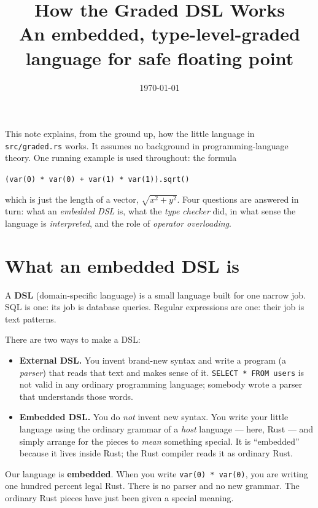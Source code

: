 \documentclass[11pt]{article}
\title{\vspace{-1.5em}How the Graded DSL Works\\[0.3em]
  \large An embedded, type-level-graded language for safe floating point}
\author{}
\date{\today}
\newcommand{\code}[1]{\texttt{#1}}
\begin{document}
\maketitle
\vspace{-2em}

\noindent
This note explains, from the ground up, how the little language in
\code{src/graded.rs} works. It assumes no background in programming-language
theory. One running example is used throughout: the formula

\begin{center}
\code{(var(0) * var(0) + var(1) * var(1)).sqrt()}
\end{center}

\noindent
which is just the length of a vector, $\sqrt{x^{2}+y^{2}}$. Four questions are
answered in turn: what an \emph{embedded DSL} is, what the \emph{type checker}
did, in what sense the language is \emph{interpreted}, and the role of
\emph{operator overloading}.

\section{What an embedded DSL is}

A \textbf{DSL} (domain-specific language) is a small language built for one
narrow job. SQL is one: its job is database queries. Regular expressions are
one: their job is text patterns.

There are two ways to make a DSL:

\begin{itemize}[leftmargin=1.4em]
  \item \textbf{External DSL.} You invent brand-new syntax and write a program
  (a \emph{parser}) that reads that text and makes sense of it. \code{SELECT *
  FROM users} is not valid in any ordinary programming language; somebody wrote
  a parser that understands those words.
  \item \textbf{Embedded DSL.} You do \emph{not} invent new syntax. You write
  your little language using the ordinary grammar of a \emph{host} language ---
  here, Rust --- and simply arrange for the pieces to \emph{mean} something
  special. It is ``embedded'' because it lives inside Rust; the Rust compiler
  reads it as ordinary Rust.
\end{itemize}

Our language is \textbf{embedded}. When you write \code{var(0) * var(0)}, you
are writing one hundred percent legal Rust. There is no parser and no new
grammar. The ordinary Rust pieces have just been given a special meaning.
\end{document}
